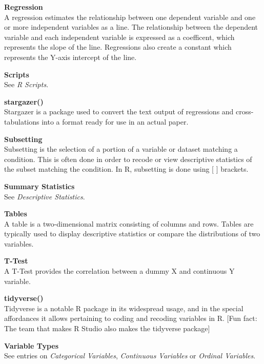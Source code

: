 \documentclass[12pt,letterpaper]{article}
\begin{document}
\textbf{Regression}\\
A regression estimates the relationship between one dependent variable and one or more independent variables as a line. The relationship between the dependent variable and each independent variable is expressed as a coefficent, which represents the slope of the line. Regressions also create a constant which represents the Y-axis intercept of the line.

\vspace{1em}

\textbf{Scripts}\\
See \textit{R Scripts}.

\vspace{1em}

\textbf{stargazer()}\\
Stargazer is a package used to convert the text output of regressions and cross-tabulations into a format ready for use in an actual paper.

\vspace{1em}


\textbf{Subsetting}\\
Subsetting is the selection of a portion of a variable or dataset matching a condition. This is often done in order to recode or view descriptive statistics of the subset matching the condition. In R, subsetting is done using [ ] brackets. 

\vspace{1em}

\textbf{Summary Statistics}\\
See \textit{Descriptive Statistics}.
\vspace{1em}

\textbf{Tables}\\
A table is a two-dimensional matrix consisting of columns and rows. Tables are typically used to display descriptive statistics or compare the distributions of two variables.

\vspace{1em}

\textbf{T-Test}\\
A T-Test provides the correlation between a dummy X and continuous Y variable.

\vspace{1em}

\textbf{tidyverse()}\\
Tidyverse is a notable R package in its widespread usage, and in the special affordances it allows pertaining to coding and recoding variables in R. [Fun fact: The team that makes R Studio also makes the tidyverse package]

\vspace{1em}


\textbf{Variable Types}\\
See entries on \textit{Categorical Variables}, \textit{Continuous Variables} or \textit{Ordinal Variables}.




\endgroup
\end{document}
